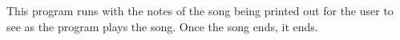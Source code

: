 This program runs with the notes of the song being printed out for the user to see as the program plays the song. Once the song ends, it ends. 